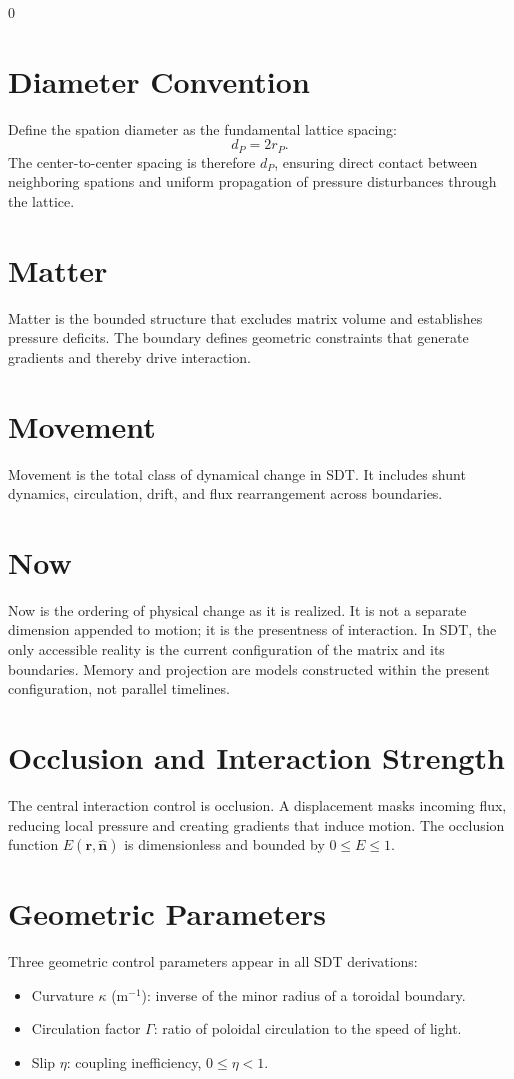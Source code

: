 0\documentclass[12pt]{book}
\begin{document}
\section{Diameter Convention}
Define the spation diameter as the fundamental lattice spacing:
\begin{equation}
d_P = 2 r_P.
\end{equation}
The center-to-center spacing is therefore $d_P$, ensuring direct contact between neighboring spations and
uniform propagation of pressure disturbances through the lattice.

\section{Matter}
Matter is the bounded structure that excludes matrix volume and establishes pressure deficits. The
boundary defines geometric constraints that generate gradients and thereby drive interaction.

\section{Movement}
Movement is the total class of dynamical change in SDT. It includes shunt dynamics, circulation, drift,
and flux rearrangement across boundaries.

\section{Now}
Now is the ordering of physical change as it is realized. It is not a separate dimension appended to
motion; it is the presentness of interaction. In SDT, the only accessible reality is the current
configuration of the matrix and its boundaries. Memory and projection are models constructed within the
present configuration, not parallel timelines.

\section{Occlusion and Interaction Strength}
The central interaction control is occlusion. A displacement masks incoming flux, reducing
local pressure and creating gradients that induce motion. The occlusion function $E(\mathbf{r}, \hat{\mathbf{n}})$
is dimensionless and bounded by $0 \le E \le 1$.

\section{Geometric Parameters}
Three geometric control parameters appear in all SDT derivations:
\begin{itemize}
\item Curvature $\kappa$ (m$^{-1}$): inverse of the minor radius of a toroidal boundary.
\item Circulation factor $\Gamma$: ratio of poloidal circulation to the speed of light.
\item Slip $\eta$: coupling inefficiency, $0 \le \eta < 1$.
\end{itemize}
\end{document}
